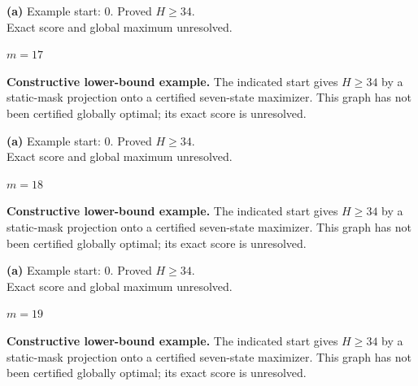 \documentclass[11pt,a4paper]{article}
\begin{document}
\begin{minipage}[t]{.94\textwidth}\centering
\resizebox{10.3cm}{!}{}\par
\small\textbf{(a)} Example start: $0$. Proved $H\ge34$.\\Exact score and global maximum unresolved.\par\end{minipage}
\clearpage
{\LARGE\bfseries $m=17$}\par\vspace{3mm}
\textbf{Constructive lower-bound example.} The indicated start gives $H\ge34$ by a static-mask projection onto a certified seven-state maximizer. This graph has not been certified globally optimal; its exact score is unresolved.\par\vspace{3mm}
\begin{minipage}[t]{.94\textwidth}\centering
\resizebox{10.3cm}{!}{}\par
\small\textbf{(a)} Example start: $0$. Proved $H\ge34$.\\Exact score and global maximum unresolved.\par\end{minipage}
\clearpage
{\LARGE\bfseries $m=18$}\par\vspace{3mm}
\textbf{Constructive lower-bound example.} The indicated start gives $H\ge34$ by a static-mask projection onto a certified seven-state maximizer. This graph has not been certified globally optimal; its exact score is unresolved.\par\vspace{3mm}
\begin{minipage}[t]{.94\textwidth}\centering
\resizebox{10.3cm}{!}{}\par
\small\textbf{(a)} Example start: $0$. Proved $H\ge34$.\\Exact score and global maximum unresolved.\par\end{minipage}
\clearpage
{\LARGE\bfseries $m=19$}\par\vspace{3mm}
\textbf{Constructive lower-bound example.} The indicated start gives $H\ge34$ by a static-mask projection onto a certified seven-state maximizer. This graph has not been certified globally optimal; its exact score is unresolved.\par\vspace{3mm}
\end{document}
